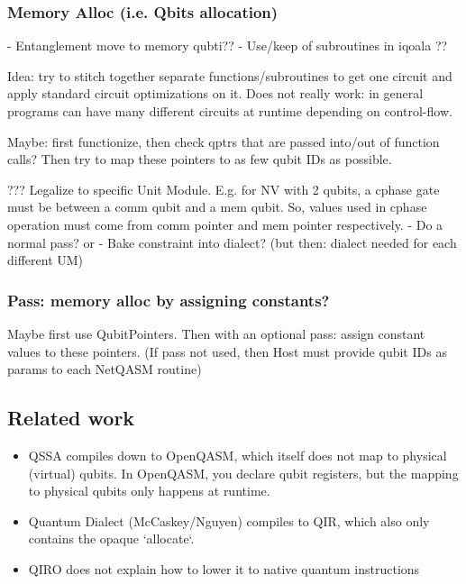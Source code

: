 \subsubsection{Memory Alloc (i.e. Qbits allocation)}
- Entanglement move to memory qubti??
- Use/keep of subroutines in iqoala ??

Idea: try to stitch together separate functions/subroutines to get one circuit and apply standard circuit optimizations on it.
Does not really work: in general programs can have many different circuits at runtime depending on control-flow.

Maybe: first functionize, then check qptrs that are passed into/out of function calls? Then try to map these pointers to as few qubit IDs as possible.

??? Legalize to specific Unit Module. E.g. for NV with 2 qubits, a cphase gate must be between a comm qubit and a mem qubit. So, values used in cphase operation must come from comm pointer and mem pointer respectively. 
- Do a normal pass? or
- Bake constraint into dialect? (but then: dialect needed for each different UM)

\subsubsection{Pass: memory alloc by assigning constants?}
Maybe first use QubitPointers. Then with an optional pass: assign constant values to these pointers. (If pass not used, then Host must provide qubit IDs as params to each NetQASM routine)

\subsection{Related work}
\begin{itemize}
\item QSSA compiles down to OpenQASM, which itself does not map to physical (virtual) qubits. In OpenQASM, you declare qubit registers, but the mapping to physical qubits only happens at runtime.
\item Quantum Dialect (McCaskey/Nguyen) compiles to QIR, which also only contains the opaque `allocate`.
\item QIRO does not explain how to lower it to native quantum instructions
\end{itemize}

